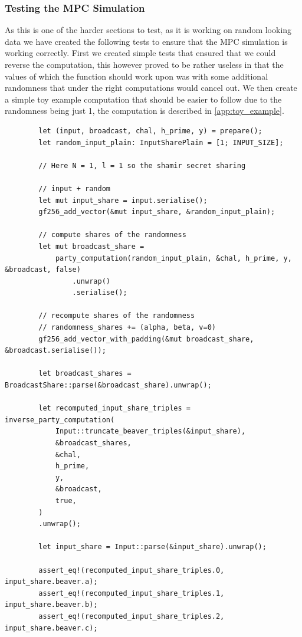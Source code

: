\documentclass[11pt]{report}
\theoremstyle{definition}
\theoremstyle{plain}
\begin{document}
\subsubsection{Testing the MPC Simulation}
As this is one of the harder sections to test, as it is working on random looking data we have created the following tests to ensure that the MPC simulation is working correctly.
First we created simple tests that ensured that we could reverse the computation, this however proved to be rather useless in that the values of which the function should work upon was with some additional randomness that under the right computations would cancel out.
We then create a simple toy example computation that should be easier to follow due to the randomness being just 1, the computation is described in \autoref{app:toy_example}.
\begin{verbatim}
        let (input, broadcast, chal, h_prime, y) = prepare();
        let random_input_plain: InputSharePlain = [1; INPUT_SIZE];

        // Here N = 1, l = 1 so the shamir secret sharing

        // input + random
        let mut input_share = input.serialise();
        gf256_add_vector(&mut input_share, &random_input_plain);

        // compute shares of the randomness
        let mut broadcast_share =
            party_computation(random_input_plain, &chal, h_prime, y, &broadcast, false)
                .unwrap()
                .serialise();

        // recompute shares of the randomness
        // randomness_shares += (alpha, beta, v=0)
        gf256_add_vector_with_padding(&mut broadcast_share, &broadcast.serialise());

        let broadcast_shares = BroadcastShare::parse(&broadcast_share).unwrap();

        let recomputed_input_share_triples = inverse_party_computation(
            Input::truncate_beaver_triples(&input_share),
            &broadcast_shares,
            &chal,
            h_prime,
            y,
            &broadcast,
            true,
        )
        .unwrap();

        let input_share = Input::parse(&input_share).unwrap();

        assert_eq!(recomputed_input_share_triples.0, input_share.beaver.a);
        assert_eq!(recomputed_input_share_triples.1, input_share.beaver.b);
        assert_eq!(recomputed_input_share_triples.2, input_share.beaver.c);
\end{verbatim}
\end{document}
